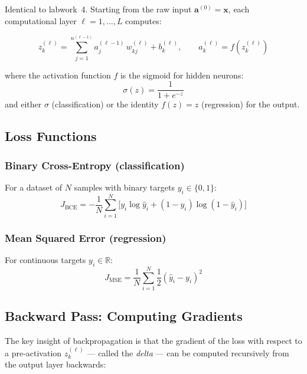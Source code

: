 \documentclass[12pt,a4paper]{article}
\begin{document}
Identical to labwork~4.
Starting from the raw input $\mathbf{a}^{(0)} = \mathbf{x}$, each computational layer
$\ell = 1, \ldots, L$ computes:

\begin{equation}
    z_k^{(\ell)} = \sum_{j=1}^{n^{(\ell-1)}} a_j^{(\ell-1)}\, w_{kj}^{(\ell)} + b_k^{(\ell)},
    \qquad
    a_k^{(\ell)} = f\!\left(z_k^{(\ell)}\right)
    \label{eq:forward}
\end{equation}

where the activation function $f$ is the sigmoid for hidden neurons:
\begin{equation}
    \sigma(z) = \frac{1}{1 + e^{-z}}
    \label{eq:sigmoid}
\end{equation}
and either $\sigma$ (classification) or the identity $f(z)=z$ (regression) for the output.

\subsection{Loss Functions}

\subsubsection{Binary Cross-Entropy (classification)}

For a dataset of $N$ samples with binary targets $y_i \in \{0,1\}$:
\begin{equation}
    J_{\mathrm{BCE}} = -\frac{1}{N} \sum_{i=1}^{N}
        \bigl[y_i \log \hat{y}_i + (1 - y_i) \log (1 - \hat{y}_i)\bigr]
    \label{eq:bce}
\end{equation}

\subsubsection{Mean Squared Error (regression)}

For continuous targets $y_i \in \mathbb{R}$:
\begin{equation}
    J_{\mathrm{MSE}} = \frac{1}{N} \sum_{i=1}^{N} \frac{1}{2}(\hat{y}_i - y_i)^2
    \label{eq:mse}
\end{equation}

\subsection{Backward Pass: Computing Gradients}

The key insight of backpropagation is that the gradient of the loss with respect to
a pre-activation $z_k^{(\ell)}$ --- called the \emph{delta} --- can be computed
recursively from the output layer backwards:
\end{document}
